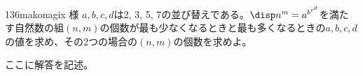 \begin{thm}{136}{}{makonagix 様}
 $a, b, c, d$は2, 3, 5, 7の並び替えである。$\disp n^m=a^{b^{c^d}}$を満たす自然数の組$(n,m)$の個数が最も少なくなるときと最も多くなるときの$a, b, c, d$の値を求め、その2つの場合の$(n,m)$の個数を求めよ。
\end{thm}

ここに解答を記述。